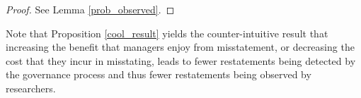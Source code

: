 \documentclass[11pt]{amsart}
\begin{document}
\begin{proof}
See Lemma \ref{prob_observed}. 
\end{proof}

Note that Proposition \ref{cool_result} yields the counter-intuitive result that increasing the benefit that managers enjoy from misstatement, or decreasing the cost that they incur in misstating, leads to fewer restatements being detected by the governance process and thus fewer restatements being observed by researchers.






%
\end{document}
